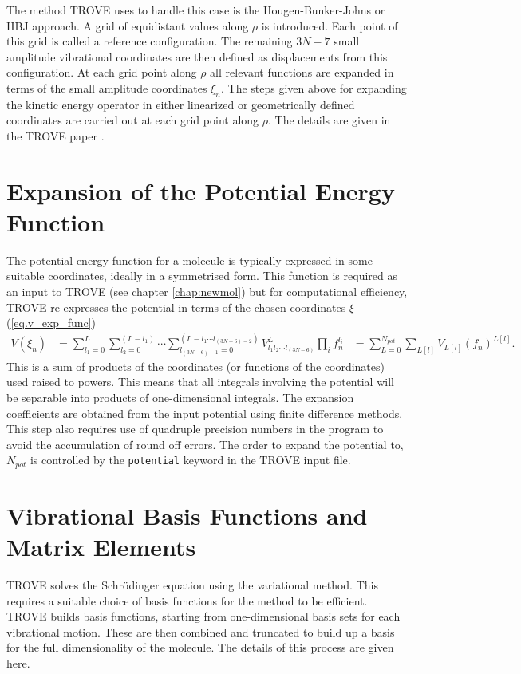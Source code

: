 The method TROVE uses to handle this case is the Hougen-Bunker-Johns or HBJ approach. A grid of equidistant values along
$\rho$ is introduced. Each point of this grid is called a reference configuration. The remaining $3N-7$ small amplitude 
vibrational coordinates are then defined as displacements from this configuration. At each grid point along $\rho$ 
all relevant functions are expanded in terms of the small amplitude coordinates $\xi_n$. The steps given 
above for expanding the kinetic energy operator in either linearized or geometrically defined coordinates are carried out
at each grid point along $\rho$. The details are given in the TROVE paper \cite{TROVE}. 


\section{Expansion of the Potential Energy Function}

The potential energy function for a molecule is typically expressed in some suitable coordinates, ideally in a symmetrised 
form. This function is required as an input to TROVE (see chapter \ref{chap:newmol}) but for computational efficiency, 
TROVE re-expresses the potential in terms of the chosen coordinates $\xi$ (\ref{eq.v_exp_func})
\begin{align}
\label{eq.V_expand}
V(\xi_n) & =  \sum_{l_1 = 0}^L \sum_{l_2 = 0}^{(L-l_1)} \cdots \sum_{l_{(3N-6)-1}=0}^{ (L-l_1 \cdots l_{(3N-6)-2})} 
                 V_{l_1 l_2 \cdots l_{(3N-6)}}^L \prod_i f_n^{l_i}
         &  = \sum_{L=0}^{N_{pot}} \sum_{L[l]} V_{L[l]}(f_n)^{L[l]}.
\end{align}
This is a sum of products of the coordinates (or functions of the coordinates) used raised to powers. This 
means that all integrals involving the potential will be separable into products of one-dimensional integrals. 
The expansion coefficients are
obtained from the input potential using finite difference methods. This step also requires use of quadruple precision numbers
in the program to avoid the accumulation of round off errors. The order to expand the potential to, $N_{pot}$ is controlled by
the  \verb|potential| keyword in the TROVE input file.


\section{Vibrational Basis Functions and Matrix Elements}
\label{sec.Vib_basis_matelem}
TROVE solves the Schr\"{o}dinger equation using the variational method. This requires a suitable choice of basis 
functions for the method to be efficient. TROVE builds basis functions, starting from one-dimensional basis sets for
each vibrational motion. These are then combined and truncated to build up a basis for the full dimensionality of the 
molecule. The details of this process are given here.

